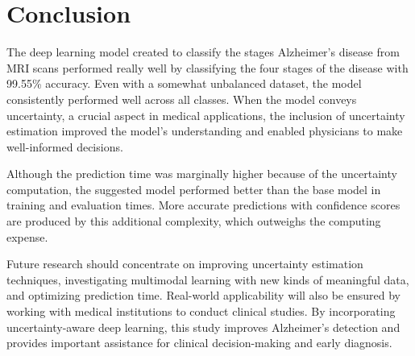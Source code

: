 \documentclass[12pt,onecolumn]{report}
\begin{document}
\chapter{Conclusion}
The deep learning model created to classify the stages Alzheimer's disease from MRI scans performed really well by classifying the four stages of the disease with 99.55\% accuracy. Even with a somewhat unbalanced dataset, the model consistently performed well across all classes. When the model conveys uncertainty, a crucial aspect in medical applications, the inclusion of uncertainty estimation improved the model's understanding and enabled physicians to make well-informed decisions.

Although the prediction time was marginally higher because of the uncertainty computation, the suggested model performed better than the base model in training and evaluation times. More accurate predictions with confidence scores are produced by this additional complexity, which outweighs the computing expense.

Future research should concentrate on improving uncertainty estimation techniques, investigating multimodal learning with new kinds of meaningful data, and optimizing prediction time. Real-world applicability will also be ensured by working with medical institutions to conduct clinical studies. By incorporating uncertainty-aware deep learning, this study improves Alzheimer's detection and provides important assistance for clinical decision-making and early diagnosis.



\cleardoublepage
\begin{sloppypar}
\printbibliography
\end{sloppypar}
\end{document}
